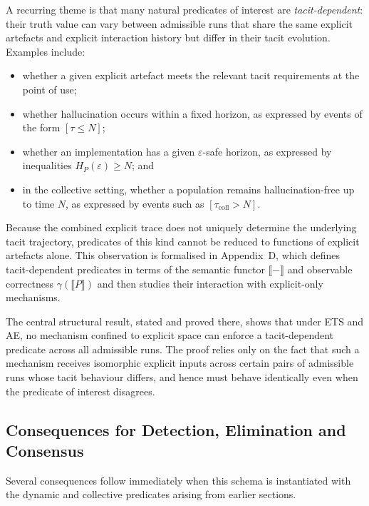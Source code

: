 \documentclass[11pt]{article}
\theoremstyle{definition}
\begin{document}
A recurring theme is that many natural predicates of interest are \emph{tacit-dependent}: their truth value can vary between admissible runs that share the same explicit artefacts and explicit interaction history but differ in their tacit evolution. Examples include:
\begin{itemize}
  \item whether a given explicit artefact meets the relevant tacit requirements at the point of use;
  \item whether hallucination occurs within a fixed horizon, as expressed by events of the form $[\tau \leq N]$;
  \item whether an implementation has a given $\varepsilon$-safe horizon, as expressed by inequalities $H_P(\varepsilon) \geq N$; and
  \item in the collective setting, whether a population remains hallucination-free up to time $N$, as expressed by events such as $[\tau_{\mathrm{coll}} > N]$.
\end{itemize}
Because the combined explicit trace does not uniquely determine the underlying tacit trajectory, predicates of this kind cannot be reduced to functions of explicit artefacts alone. This observation is formalised in Appendix~D, which defines tacit-dependent predicates in terms of the semantic functor $\llbracket - \rrbracket$ and observable correctness $\gamma(\llbracket P \rrbracket)$ and then studies their interaction with explicit-only mechanisms.

The central structural result, stated and proved there, shows that under ETS and AE, no mechanism confined to explicit space can enforce a tacit-dependent predicate across all admissible runs. The proof relies only on the fact that such a mechanism receives isomorphic explicit inputs across certain pairs of admissible runs whose tacit behaviour differs, and hence must behave identically even when the predicate of interest disagrees.

\subsection{Consequences for Detection, Elimination and Consensus}

Several consequences follow immediately when this schema is instantiated with the dynamic and collective predicates arising from earlier sections.
\end{document}
